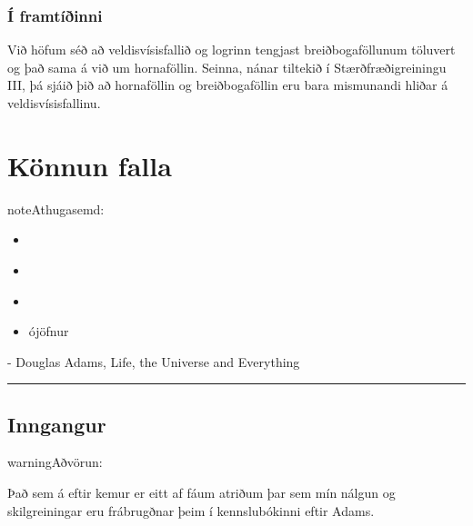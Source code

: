 \documentclass[b5paper,10pt,icelandic]{sphinxmanual}
\begin{document}
\subsection{Í framtíðinni}
\label{\detokenize{kafli04:i-framtiinni}}
Við höfum séð að veldisvísisfallið og logrinn tengjast breiðbogaföllunum
töluvert og það sama á við um hornaföllin. Seinna, nánar tiltekið í
Stærðfræðigreiningu III, þá sjáið þið að hornaföllin og breiðbogaföllin
eru bara mismunandi hliðar á veldisvísisfallinu.



\chapter{Könnun falla}
\label{\detokenize{kafli05:konnun-falla}}\label{\detokenize{kafli05::doc}}
\begin{sphinxadmonition}{note}{Athugasemd:}
\begin{itemize}
\item {} 
{\hyperref[\detokenize{kafli03:vaxandiminnkandi}]{}}

\item {} 
{\hyperref[\detokenize{kafli03:afleidur}]{}}

\item {} 
{\hyperref[\detokenize{kafli03:utgildi}]{}}

\item {} 
ójöfnur

\end{itemize}
\end{sphinxadmonition}


- Douglas Adams, Life, the Universe and Everything


\bigskip\hrule\bigskip



\section{Inngangur}
\label{\detokenize{kafli05:inngangur}}
\begin{sphinxadmonition}{warning}{Aðvörun:}

Það sem á eftir kemur er eitt af fáum atriðum þar sem mín nálgun og
skilgreiningar eru frábrugðnar þeim í kennslubókinni eftir Adams.
\end{sphinxadmonition}
\end{document}
